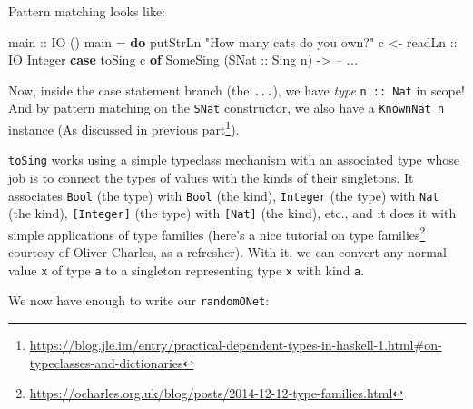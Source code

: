 \documentclass[]{article}
\newenvironment{Shaded}{}{}
\newcommand{\KeywordTok}[1]{\textcolor[rgb]{0.00,0.44,0.13}{\textbf{{#1}}}}
\newcommand{\DataTypeTok}[1]{\textcolor[rgb]{0.56,0.13,0.00}{{#1}}}
\newcommand{\StringTok}[1]{\textcolor[rgb]{0.25,0.44,0.63}{{#1}}}
\newcommand{\CommentTok}[1]{\textcolor[rgb]{0.38,0.63,0.69}{\textit{{#1}}}}
\newcommand{\OtherTok}[1]{\textcolor[rgb]{0.00,0.44,0.13}{{#1}}}
\newcommand{\FunctionTok}[1]{\textcolor[rgb]{0.02,0.16,0.49}{{#1}}}
\newcommand{\NormalTok}[1]{{#1}}
\renewcommand{\href}[2]{#2\footnote{\url{#1}}}
\begin{document}
Pattern matching looks like:

\begin{Shaded}
\begin{Highlighting}[]
\OtherTok{main ::} \DataTypeTok{IO} \NormalTok{()}
\NormalTok{main }\FunctionTok{=} \KeywordTok{do}
    \NormalTok{putStrLn }\StringTok{"How many cats do you own?"}
    \NormalTok{c }\OtherTok{<- readLn ::} \DataTypeTok{IO} \DataTypeTok{Integer}
    \KeywordTok{case} \NormalTok{toSing c }\KeywordTok{of}
      \DataTypeTok{SomeSing} \NormalTok{(}\DataTypeTok{SNat}\OtherTok{ ::} \DataTypeTok{Sing} \NormalTok{n) }\OtherTok{->} \CommentTok{-- ...}
\end{Highlighting}
\end{Shaded}

Now, inside the case statement branch (the \texttt{...}), we have \emph{type}
\texttt{n\ ::\ Nat} in scope! And by pattern matching on the \texttt{SNat}
constructor, we also have a \texttt{KnownNat\ n} instance (As discussed in
\href{https://blog.jle.im/entry/practical-dependent-types-in-haskell-1.html\#on-typeclasses-and-dictionaries}{previous
part}).

\texttt{toSing} works using a simple typeclass mechanism with an associated type
whose job is to connect the types of values with the kinds of their singletons.
It associates \texttt{Bool} (the type) with \texttt{Bool} (the kind),
\texttt{Integer} (the type) with \texttt{Nat} (the kind), \texttt{{[}Integer{]}}
(the type) with \texttt{{[}Nat{]}} (the kind), etc., and it does it with simple
applications of type families (here's a
\href{https://ocharles.org.uk/blog/posts/2014-12-12-type-families.html}{nice
tutorial on type families} courtesy of Oliver Charles, as a refresher). With it,
we can convert any normal value \texttt{x} of type \texttt{a} to a singleton
representing type \texttt{x} with kind \texttt{a}.

We now have enough to write our \texttt{randomONet}:

\begin{Shaded}
\end{Shaded}
\end{document}
